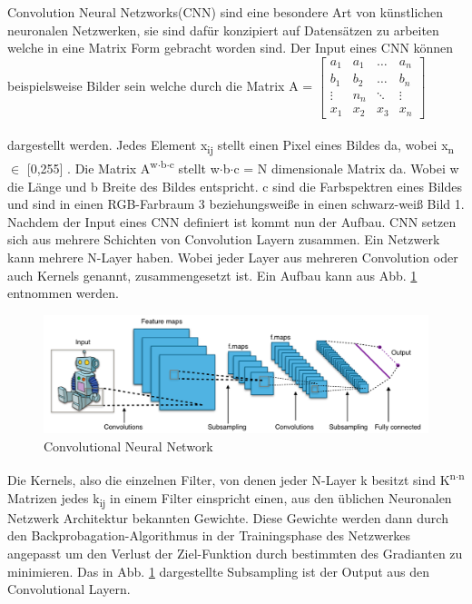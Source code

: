 \documentclass{llncs}
\begin{document}
Convolution Neural Netzworks(CNN) sind eine besondere Art von künstlichen neuronalen Netzwerken, sie sind dafür konzipiert auf Datensätzen zu arbeiten welche in eine Matrix Form gebracht worden sind. Der Input eines CNN können beispielsweise Bilder sein welche durch die Matrix A =
$
\begin{bmatrix}
a_1	& a_1	& \dots	 & a_n     \\
b_1	& b_2 	& \dots  & b_n	  \\
\vdots	& n_n 	& \ddots & \vdots \\
x_1 	& x_2 & x_3	 & x_n
\end{bmatrix}
$
\\\\dargestellt werden. Jedes Element x\textsubscript{ij} stellt einen Pixel eines Bildes da, wobei x\textsubscript{n} $\in$ [0,255] . Die Matrix A\textsuperscript{w$\cdot$b$\cdot$c} stellt w$\cdot$b$\cdot$c = N dimensionale Matrix da. Wobei w die Länge und b Breite des Bildes entspricht. c sind die Farbspektren eines Bildes und sind in einen RGB-Farbraum 3 beziehungsweiße in einen schwarz-weiß Bild 1. Nachdem  der Input eines CNN definiert ist kommt nun der Aufbau. CNN setzen sich aus mehrere Schichten von Convolution Layern zusammen. Ein Netzwerk kann mehrere N-Layer haben. Wobei jeder Layer aus mehreren Convolution oder auch Kernels genannt, zusammengesetzt ist. Ein Aufbau kann aus Abb. \ref{fig:Bild10} entnommen werden\cite{Grundlagen}.
\begin{figure}[htbp] 
	\centering
	\includegraphics[width=1.0\textwidth]{convol.png}
	\caption{Convolutional Neural Network}
	\label{fig:Bild10}
\end{figure}
Die Kernels, also die einzelnen Filter, von denen jeder N-Layer k besitzt sind K\textsuperscript{n$\cdot$n} Matrizen jedes k\textsubscript{ij} in einem Filter einspricht einen, aus den üblichen Neuronalen Netzwerk Architektur bekannten Gewichte. Diese Gewichte werden dann durch den Backprobagation-Algorithmus in der Trainingsphase des Netzwerkes angepasst um den Verlust der Ziel-Funktion durch bestimmten des Gradianten zu minimieren. Das in Abb. \ref{fig:Bild10} dargestellte Subsampling ist der Output aus den Convolutional Layern\cite{Grundlagen}. 
\end{document}

